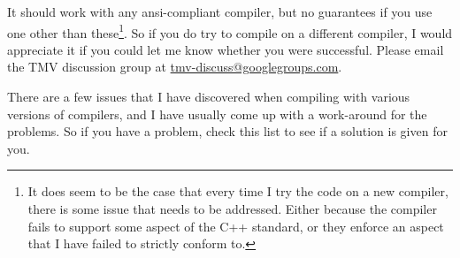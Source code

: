 \documentclass[twoside,letterpaper,11pt]{article}
\makeatletter
\newcommand{\mygroupx}{tmv-discuss@googlegroups.com}
\newcommand{\mygroup}{\href{mailto:\mygroupx}{\mygroupx}}
\makeatother
\begin{document}
It should work with any ansi-compliant
compiler, but no guarantees if you use one other than these\footnote{
It does seem to be the case that 
every time I try the code on a new compiler, there is some issue that needs to be addressed.  
Either because the compiler fails to support some aspect of the C++ standard, or they enforce
an aspect that I have failed to strictly conform to.}.
  So if you do try to compile on a different compiler, 
I would appreciate it if you could let me know whether you were successful.  
Please email the TMV discussion group at \mygroup.

There are a few issues that I have discovered when compiling with various 
versions of compilers, and I have usually come up with a work-around for
the problems.  So if you have a problem, check this list to see if a solution
is given for you.  
\end{document}
